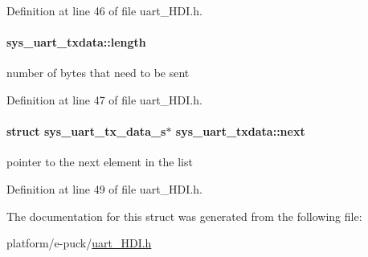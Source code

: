 Definition at line 46 of file uart\+\_\+\+H\+D\+I.\+h.

\hypertarget{structsys__uart__txdata_ae3cfb063b546b81d0755cd3a38128a7b}{}
\paragraph[{length}]{ sys\+\_\+uart\+\_\+txdata\+::length}\label{structsys__uart__txdata_ae3cfb063b546b81d0755cd3a38128a7b}
number of bytes that need to be sent 

Definition at line 47 of file uart\+\_\+\+H\+D\+I.\+h.

\hypertarget{structsys__uart__txdata_a6973ea48e25f4d9abaed720cad5f0212}{}
\paragraph[{next}]{\setlength{\rightskip}{0pt plus 5cm}struct sys\+\_\+uart\+\_\+tx\+\_\+data\+\_\+s$\ast$ sys\+\_\+uart\+\_\+txdata\+::next}\label{structsys__uart__txdata_a6973ea48e25f4d9abaed720cad5f0212}
pointer to the next element in the list 

Definition at line 49 of file uart\+\_\+\+H\+D\+I.\+h.



The documentation for this struct was generated from the following file\+:\begin{DoxyCompactItemize}
\item 
platform/e-\/puck/\hyperlink{uart__HDI_8h}{uart\+\_\+\+H\+D\+I.\+h}\end{DoxyCompactItemize}
